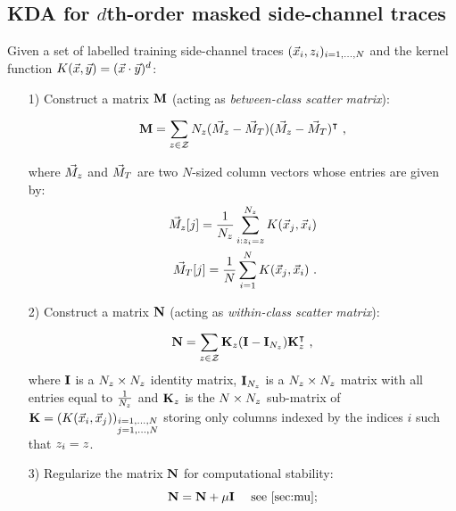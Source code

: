 \subsection{KDA for $d$th-order masked side-channel traces}\label{sec:KDA}
Given a set of labelled training side-channel traces $(\vLeakVec_i, \sensVar_i)_{i=1, \dots , \nbTraces}$ and the kernel function $K(\vLeakVec,\yyy)= (\vLeakVec \cdot \yyy)^d$:
\begin{itemize}

\item[1)] Construct a matrix $\MMM$ (acting as \emph{between-class scatter matrix}):

\begin{equation}
\MMM = \sum_{\sensVar\in\sensVarSet}\nbTracesPerClass(\MMMclass - \MMMT)(\MMMclass-\MMMT)^\intercal\mbox{ ,}
\end{equation}

where $\MMMclass$ and $\MMMT$ are two $N$-sized column vectors whose entries are given by:
\begin{align}
\MMMclass[\sensVar][j] = \frac{1}{\nbTracesPerClass}\sum_{i:\sensVar_i=\sensVar}^{\nbTracesPerClass}K(\vLeakVec_j,\vLeakVec_i)\\
\MMMT[j] = \frac{1}{\nbTraces}\sum_{i=1}^{\nbTraces}K(\vLeakVec_{j},\vLeakVec_{i}) \mbox{ .}
\end{align}


\item[2)] Construct a matrix $\NNN$ (acting as \emph{within-class scatter matrix}):

\begin{equation}\label{eq:N}
\NNN = \sum_{\sensVar\in\sensVarSet}\kernelMatrix_\sensVar(\III - \III_{\nbTracesPerClass})\kernelMatrix_\sensVar^\intercal\mbox{ ,}
\end{equation}
where $\III$ is a $\nbTracesPerClass \times \nbTracesPerClass$ identity matrix, $\III_{\nbTracesPerClass}$ is a $\nbTracesPerClass \times \nbTracesPerClass$ matrix with all entries equal to $\frac{1}{\nbTracesPerClass}$ and $\kernelMatrix_{\sensVar}$ is the $\nbTraces \times \nbTracesPerClass$ sub-matrix of $\kernelMatrix = (K(\vLeakVec_i,\vLeakVec_j))_{\substack{i=1,\dots,\nbTraces \\ j=1,\dots,\nbTraces}}$ storing only columns indexed by the indices $i$ such that $\sensVar_i=\sensVar$. 

\item[3)] Regularize the  matrix $\NNN$ for computational stability:
\begin{equation}\label{eq:mu}
\NNN = \NNN + \mu  \III \quad \mbox{ see \ref{sec:mu};}
\end{equation}


\end{itemize}
